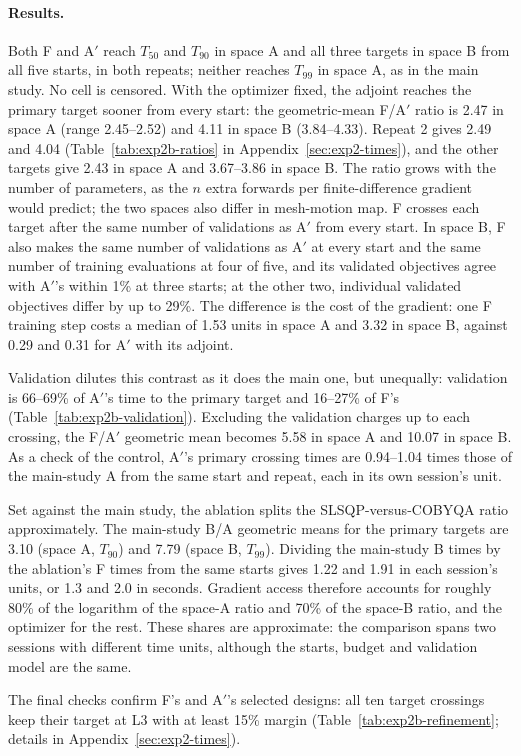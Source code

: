\paragraph{Results.}
Both F and A$'$ reach $T_{50}$ and $T_{90}$ in space A and all three
targets in space B from all five starts, in both repeats; neither reaches
$T_{99}$ in space A, as in the main study. No cell is censored. With the
optimizer fixed, the adjoint reaches the primary target sooner from every
start: the geometric-mean F/A$'$ ratio is 2.47 in space A (range
2.45--2.52) and 4.11 in space B (3.84--4.33). Repeat 2 gives 2.49 and 4.04
(Table~\ref{tab:exp2b-ratios} in Appendix~\ref{sec:exp2-times}), and the
other targets give 2.43 in space A and 3.67--3.86 in space B. The ratio
grows with the number of parameters, as the $n$ extra forwards per
finite-difference gradient would predict; the two spaces also differ in
mesh-motion map. F crosses each target after the same number of
validations as A$'$ from every start. In space B, F also makes the same
number of validations as A$'$ at every start and the same number of
training evaluations at four of five, and its validated objectives agree
with A$'$'s within 1\% at three starts; at the other two, individual
validated objectives differ by up to 29\%.
The difference is the cost of the gradient: one F training step costs a
median of 1.53 units in space A and 3.32 in space B, against 0.29 and 0.31
for A$'$ with its adjoint.

Validation dilutes this contrast as it does the main one, but unequally:
validation is 66--69\% of A$'$'s time to the primary target and 16--27\% of
F's (Table~\ref{tab:exp2b-validation}). Excluding the validation charges up
to each crossing, the F/A$'$ geometric mean becomes 5.58 in space A and
10.07 in space B. As a check of the control, A$'$'s primary crossing times
are 0.94--1.04 times those of the main-study A from the same start and
repeat, each in its own session's unit.

Set against the main study, the ablation splits the SLSQP-versus-COBYQA
ratio approximately. The main-study B/A geometric means for the primary
targets are 3.10 (space A, $T_{90}$) and 7.79 (space B, $T_{99}$). Dividing
the main-study B times by the ablation's F times from the same starts gives
1.22 and 1.91 in each session's units, or 1.3 and 2.0 in seconds. Gradient
access therefore accounts for roughly 80\% of the logarithm of the space-A
ratio and 70\% of the space-B ratio, and the optimizer for the rest. These
shares are approximate: the comparison spans two sessions with different
time units, although the starts, budget and validation model are the same.

The final checks confirm F's and A$'$'s selected designs: all ten target
crossings keep their target at L3 with at least 15\% margin
(Table~\ref{tab:exp2b-refinement}; details in Appendix~\ref{sec:exp2-times}).
